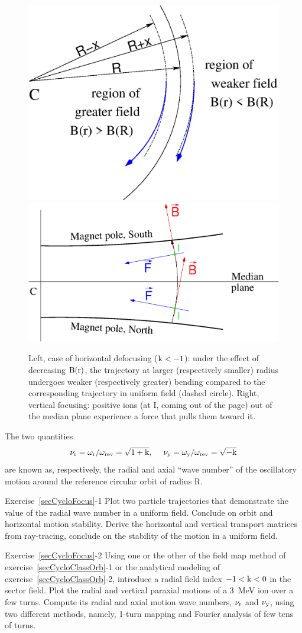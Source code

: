 \begin{figure}[ht]
\centering
\sidebyside
{
    \includegraphics[width=0.45\linewidth]{./figs_cyclo/weakFocusingH.eps}
}
{
    \includegraphics[width=0.45\linewidth]{./figs_cyclo/weakFocusingV.eps}
}
    \caption{  \label{FigWeakFoc}
Left, case of horizontal defocusing ($\rm k<-1$): 
under the effect of decreasing $\rm B(r)$, the trajectory at larger  (respectively smaller) radius
undergoes weaker (respectively greater) bending compared to the corresponding trajectory in uniform field (dashed circle).  
Right, vertical focusing:  positive ions (at I, coming out of the page) out of the median plane experience a force that 
pulls them toward it.  
}
\end{figure}
 
The two quantities 
\begin{equation} \rm
\label{EqTunes}
  \nu_r = \omega_r/\omega_{\rm rev} = \sqrt{1+k},   ~ ~ ~ ~ 
 \nu_y=\omega_y /\omega_{\rm rev}  = \sqrt{-k} 
\end{equation}
are known  as, respectively, the radial and axial ``wave number'' of 
the oscillatory motion around the reference circular orbit of radius R.

\smallskip
\noindent {\small $\bullet$} Exercise~\ref{secCycloFocus}-1
Plot two particle trajectories that demonstrate the value of the radial wave number in a uniform 
field. Conclude on orbit and horizontal motion  stability. 
Derive the horizontal and vertical  transport matrices from ray-tracing, conclude on the stability of the 
 motion in a uniform field.

\smallskip
\noindent {\small $\bullet$} Exercise~\ref{secCycloFocus}-2
Using one or the other of the field map method of exercise~\ref{secCycloClassOrb}-1 or the analytical modeling 
of exercise~\ref{secCycloClassOrb}-2, introduce a radial field index $\rm -1<k<0$ in the sector field. 
Plot the radial and vertical paraxial motions of a 3~MeV ion over a few turns. 
Compute its radial and axial motion wave numbers, $\rm \nu_r$ and $\rm \nu_y$, 
using two different methods, namely, 1-turn mapping and  Fourier analysis of few tens of turns. 


